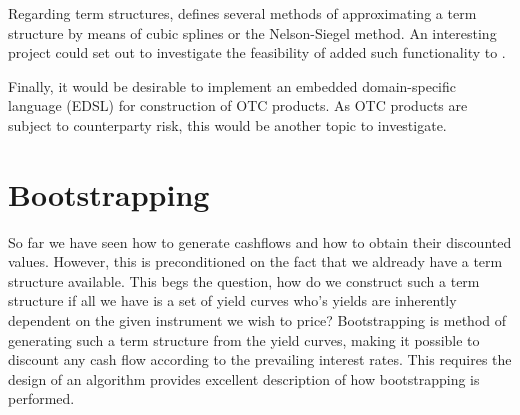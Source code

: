 Regarding term structures, \cite{cmunk} defines several methods of approximating
a term structure by means of cubic splines or the Nelson-Siegel method. An 
interesting project could set out to investigate the feasibility of added such 
functionality to \hql.

Finally, it would be desirable to implement an embedded domain-specific 
language (EDSL) for construction of OTC products.
As OTC products are subject to counterparty risk, this would be another topic 
to investigate.

\section{Bootstrapping}

So far we have seen how to generate cashflows and how to obtain their 
discounted values. However, this is preconditioned on the fact that we aldready 
have a term structure available. This begs the question, how do we construct 
such a term structure if all we have is a set of yield curves who’s yields 
are inherently dependent on the given instrument we wish to price?
Bootstrapping is method of generating such a term structure from the yield 
curves, making it possible to discount any cash flow according to the 
prevailing interest rates.
This requires the design of an algorithm
\cite{HULL} provides excellent description of how bootstrapping is performed.
